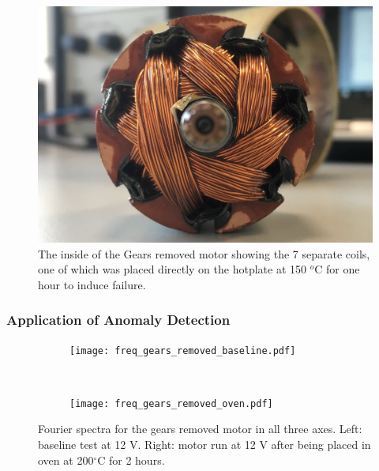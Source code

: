 \begin{figure}[t]
    \includegraphics[width=1.0\textwidth]{fig/Gears_Removed_Inside.JPG}
    \caption[Inside Workings of Motor D]{The inside of the Gears removed motor showing the 7 separate coils, one of which was placed directly on the hotplate at 150 $^o$C for one hour to induce failure.}
    \label{fig:hotplate_motor}
\end{figure}


\subsubsection{Application of Anomaly Detection}


\begin{figure}[t!]
    \centering
    \begin{subfigure}[t]{0.5\textwidth}
        \centering
        \texttt{[image: freq\_gears\_removed\_baseline.pdf]}
    \end{subfigure}%
    ~ 
    \begin{subfigure}[t]{0.5\textwidth}
        \centering
        \texttt{[image: freq\_gears\_removed\_oven.pdf]}
    \end{subfigure}
    \caption[Fourier Plot Overheating]{Fourier spectra for the gears removed motor in all three axes. Left: baseline test at 12 V. Right: motor run at 12 V after being placed in oven at 200$^{\circ}$C for 2 hours.}
    \label{fig:overheating_fourier}
\end{figure}


